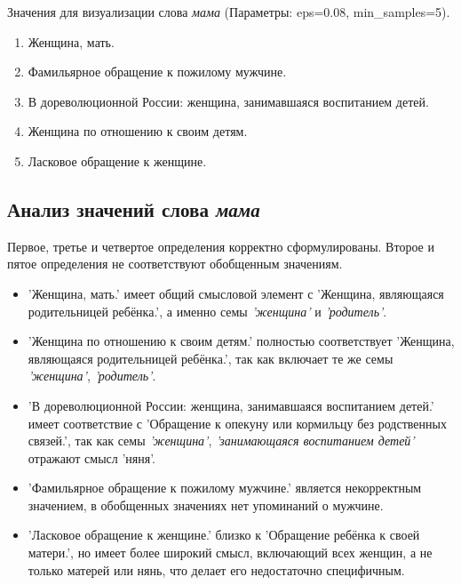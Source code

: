 Значения для визуализации слова \textit{мама} (Параметры: eps=0.08, min\_samples=5).

\begin{enumerate}
    \item Женщина, мать.
    \item Фамильярное обращение к пожилому мужчине.
    \item В дореволюционной России: женщина, занимавшаяся воспитанием детей.
    \item Женщина по отношению к своим детям.
    \item Ласковое обращение к женщине.
\end{enumerate}

\subsection*{Анализ значений слова \textit{мама}}

Первое, третье и четвертое определения корректно сформулированы.
Второе и пятое определения не соответствуют обобщенным значениям.

\begin{itemize}
    \item ’Женщина, мать.’ имеет общий смысловой элемент с
’Женщина, являющаяся родительницей ребёнка.’, а именно семы \textit{’женщина’} и \textit{’родитель’}.

    \item ’Женщина по отношению к своим детям.’ полностью соответствует
’Женщина, являющаяся родительницей ребёнка.’, так как включает те же семы \textit{’женщина’}, \textit{’родитель’}.

    \item ’В дореволюционной России: женщина, занимавшаяся воспитанием детей.’ имеет соответствие с
’Обращение к опекуну или кормильцу без родственных связей.’,
так как семы \textit{’женщина’}, \textit{’занимающаяся воспитанием детей’} отражают смысл ’няня’.
\end{itemize}

\begin{itemize}
    \item ’Фамильярное обращение к пожилому мужчине.’ является некорректным значением,
в обобщенных значениях нет упоминаний о мужчине.

    \item ’Ласковое обращение к женщине.’ близко к
’Обращение ребёнка к своей матери.’, но имеет более широкий смысл, включающий всех женщин,
а не только матерей или нянь, что делает его недостаточно специфичным.
\end{itemize}

